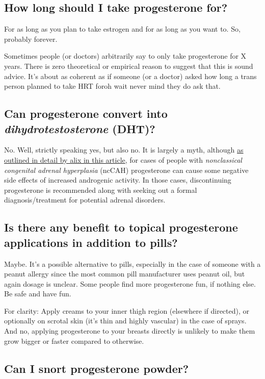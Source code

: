 \documentclass{article}
\begin{document}
\subsection{How long should I take progesterone for?}

For as long as you plan to take estrogen and for as long as you want to. So, probably forever.

Sometimes people (or doctors) arbitrarily say to only take progesterone for X years. There is zero theoretical or empirical reason to suggest that this is sound advice. It's about as coherent as if someone (or a doctor) asked how long a trans person planned to take HRT for\textemdash{}oh wait never mind they do ask that.

\subsection{Can progesterone convert into \textit{dihydrotestosterone} (DHT)?}

No. Well, strictly speaking yes, but also no. It is largely a myth, although \href{https://whsah.co/posts/rethinking-progesterone-and-androgens/}{as outlined in detail by alix in this article}, for cases of people with \textit{nonclassical congenital adrenal hyperplasia} (ncCAH) progesterone can cause some negative side effects of increased androgenic activity. In those cases, discontinuing progesterone is recommended along with seeking out a formal diagnosis/treatment for potential adrenal disorders.

\subsection{Is there any benefit to topical progesterone applications in addition to pills?}

Maybe. It's a possible alternative to pills, especially in the case of someone with a peanut allergy since the most common pill manufacturer uses peanut oil, but again dosage is unclear. Some people find more progesterone fun, if nothing else. Be safe and have fun.

For clarity: Apply creams to your inner thigh region (elsewhere if directed), or optionally on scrotal skin (it's thin and highly vascular) in the case of sprays. And no, applying progesterone to your breasts directly is unlikely to make them grow bigger or faster compared to otherwise. 

\subsection{Can I snort progesterone powder?}
\end{document}
